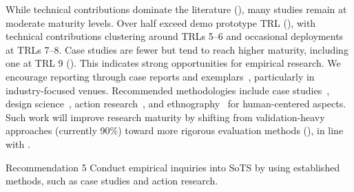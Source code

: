 While technical contributions dominate the literature (), many studies remain at moderate maturity levels. Over half exceed demo prototype TRL (), with technical contributions clustering around TRLs 5--6 and occasional deployments at TRLs 7--8. Case studies are fewer but tend to reach higher maturity, including one at TRL 9 (). This indicates strong opportunities for empirical research. We encourage reporting through case reports and exemplars~\cite{mezard2007where}, particularly in industry-focused venues. Recommended methodologies include case studies~\cite{wohlin2021case}, design science~\cite{dresch2015design}, action research~\cite{cohen2017research}, and ethnography~\cite{sharp2010using} for human-centered aspects. Such work will improve research maturity by shifting from validation-heavy approaches (currently 90\%) toward more rigorous evaluation methods (), in line with \textcite{petersen2015guidelines}.

\begin{recoframe}{Recommendation 5}
Conduct empirical inquiries into SoTS by using established methods, such as case studies and action research.
\end{recoframe}